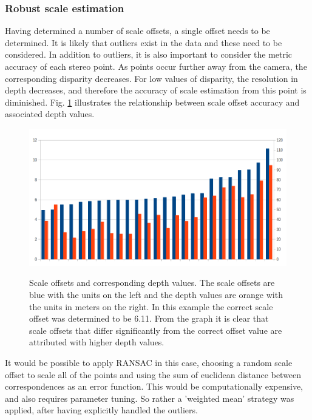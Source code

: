 \subsubsection{Robust scale estimation}

Having determined a number of scale offsets, a single offset needs to be determined.  It is likely that outliers exist in the data and these need to be considered.  In addition to outliers, it is also important to consider the metric accuracy of each stereo point.  As points occur further away from the camera, the corresponding disparity decreases.  For low values of disparity, the resolution in depth decreases, and therefore the accuracy of scale estimation from this point is diminished. Fig. \ref{fig:scale_bar_graph} illustrates the relationship between scale offset accuracy and associated depth values.

\begin{figure}[h]
  \centering
    \includegraphics[width=1.0\textwidth]{chapters/images/scale_offset_bar_graph}\\
  \caption{Scale offsets and corresponding depth values.  The scale offsets are blue with the units on the left and the depth values are orange with the units in meters on the right. In this example the correct scale offset was determined to be 6.11.  From the graph it is clear that scale offsets that differ significantly from the correct offset value are attributed with higher depth values.}
  \label{fig:scale_bar_graph}
\end{figure}

It would be possible to apply RANSAC in this case, choosing a random scale offset to scale all of the points and using the sum of euclidean distance between correspondences as an error function.  This would be computationally expensive, and also requires parameter tuning.  So rather a 'weighted mean' strategy was applied, after having explicitly handled the outliers.

